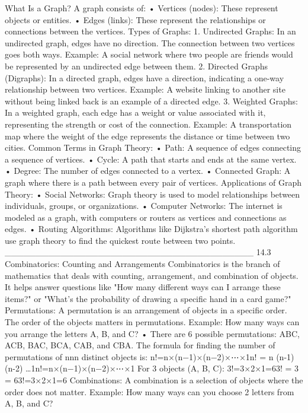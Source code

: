 What Is a Graph?
A graph consists of:
•	Vertices (nodes): These represent objects or entities.
•	Edges (links): These represent the relationships or connections between the vertices.
Types of Graphs:
1.	Undirected Graphs: In an undirected graph, edges have no direction. The connection between two vertices goes both ways.
Example: A social network where two people are friends would be represented by an undirected edge between them.
2.	Directed Graphs (Digraphs): In a directed graph, edges have a direction, indicating a one-way relationship between two vertices.
Example: A website linking to another site without being linked back is an example of a directed edge.
3.	Weighted Graphs: In a weighted graph, each edge has a weight or value associated with it, representing the strength or cost of the connection.
Example: A transportation map where the weight of the edge represents the distance or time between two cities.
Common Terms in Graph Theory:
•	Path: A sequence of edges connecting a sequence of vertices.
•	Cycle: A path that starts and ends at the same vertex.
•	Degree: The number of edges connected to a vertex.
•	Connected Graph: A graph where there is a path between every pair of vertices.
Applications of Graph Theory:
•	Social Networks: Graph theory is used to model relationships between individuals, groups, or organizations.
•	Computer Networks: The internet is modeled as a graph, with computers or routers as vertices and connections as edges.
•	Routing Algorithms: Algorithms like Dijkstra’s shortest path algorithm use graph theory to find the quickest route between two points.
________________________________________
14.3 Combinatorics: Counting and Arrangements
Combinatorics is the branch of mathematics that deals with counting, arrangement, and combination of objects. It helps answer questions like "How many different ways can I arrange these items?" or "What’s the probability of drawing a specific hand in a card game?"
Permutations:
A permutation is an arrangement of objects in a specific order. The order of the objects matters in permutations.
Example: How many ways can you arrange the letters A, B, and C?
•	There are 6 possible permutations: ABC, ACB, BAC, BCA, CAB, and CBA.
The formula for finding the number of permutations of nnn distinct objects is:
n!=n×(n−1)×(n−2)×⋯×1n! = n \times (n-1) \times (n-2) \times \dots \times 1n!=n×(n−1)×(n−2)×⋯×1
For 3 objects (A, B, C):
3!=3×2×1=63! = 3   = 63!=3×2×1=6
Combinations:
A combination is a selection of objects where the order does not matter.
Example: How many ways can you choose 2 letters from A, B, and C?
